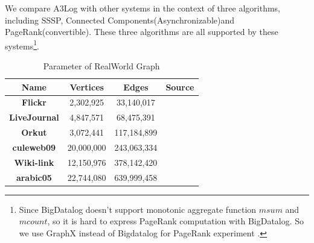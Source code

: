 We compare A3Log with other systems in the context of three algorithms, including SSSP, Connected Components(Asynchronizable)and PageRank(convertible). These three algorithms are all supported by these systems\footnote{Since BigDatalog doesn't support monotonic aggregate function $msum$ and $mcount$, so it is hard to express PageRank computation with BigDatalog. So we use GraphX instead of Bigdatalog for PageRank experiment .}.
\begin{table}[!t]
	\caption{Parameter of RealWorld Graph }
	\hspace{-0.15in}
	\vspace{0.0in}
	\label{tab:Dataset}
	\centering
	\small
	\begin{tabular}{c|c|c|c}
		\hline\hline
		{\textbf{Name}} &
		{\textbf{Vertices}} &
		{\textbf{Edges}} &
		{\textbf{Source}} \\
		\hline
		{\textbf{Flickr}} & 2,302,925 &33,140,017   &\cite{} \\
		\hline
		{\textbf{LiveJournal}} & 4,847,571 & 68,475,391 &\cite{}\\
		\hline
		{\textbf{Orkut}} &3,072,441& 117,184,899 & \cite{} \\
		\hline
		{\textbf{culeweb09}} & 20,000,000 & 243,063,334 &\cite{}\\		\hline
		{\textbf{Wiki-link}} & 12,150,976 &378,142,420&\cite{} \\
		\hline
		{\textbf{arabic05}} & 22,744,080 & 639,999,458 &\cite{}\\		\hline
		\hline
	\end{tabular}
	\vspace{-0.1in}
	
\end{table}
